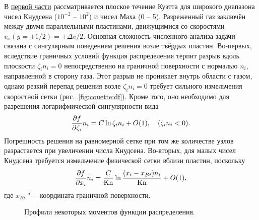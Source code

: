 В \underline{первой части} рассматривается плоское течение Куэтта для широкого диапазона
чисел Кнудсена (\(10^{-2}\) -- \(10^2\)) и чисел Маха (0 -- 5).
Разреженный газ заключён между двумя параллельными пластинами, движущимися со скоростями \(v_x(y=\pm1/2)=\pm\Delta{v}/2\).
Основная сложность численного анализа задачи связана с сингулярным поведением решения возле твёрдых пластин.
Во-первых, вследствие граничных условий функция распределения терпит разрыв вдоль плоскости \(\zeta_in_i=0\)
непосредственно на граничной поверхности с нормалью \(n_i\), направленной в сторону газа.
Этот разрыв не проникает внутрь области с газом, однако резкий перепад решения возле \(\zeta_in_i=0\)
требует сильного измельчения скоростной сетки (рис.~\ref{fig:couette:df}).
Кроме того, оно необходимо для разрешения логарифмической сингулярности вида~\autocite{Takata2016}
\begin{equation*}
    \pder[f]{\zeta_i}n_i = C\ln\zeta_in_i + \OO{1}, \quad (\zeta_in_i<0).
\end{equation*}
Погрешность решения на равномерной сетке при том же количестве узлов
разрастается при увеличении числа Кнудсена.
Во-вторых, для малых чисел Кнудсена требуется измельчение физической сетки вблизи пластин, поскольку
\begin{equation*}
    \pder[f]{x_i}n_i = \frac{C}{\Kn}\ln\frac{(x_i-x_{Bi})n_i}{\Kn} + \OO{1},
\end{equation*}
где \(x_{Bi}\) "--- координата граничной поверхности.

\begin{figure}
    \centering
    \caption{Профили некоторых моментов функции распределения.}
    \label{fig:couette:profiles}
\end{figure}

